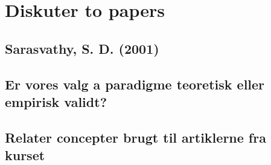 \documentclass[a4paper]{article}
\begin{document}






\label{paradigme}


\section{Diskuter to papers}

\subsection{Sarasvathy, S. D. (2001)}


\subsection{Er vores valg a paradigme teoretisk eller empirisk validt?}
\subsection{Relater concepter brugt til artiklerne fra kurset}




\printbibliography[heading=bibintoc]
\end{document}
